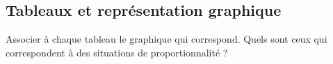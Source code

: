 
\subsection*{Tableaux et représentation graphique}

Associer à chaque tableau le graphique qui correspond. Quels sont ceux qui correspondent à des situations de proportionnalité ?

\begin{equation}
    \quad
    
\end{equation}
\begin{equation}
    \quad
    
\end{equation}

\begin{center}
   
   
   
   
\end{center}
